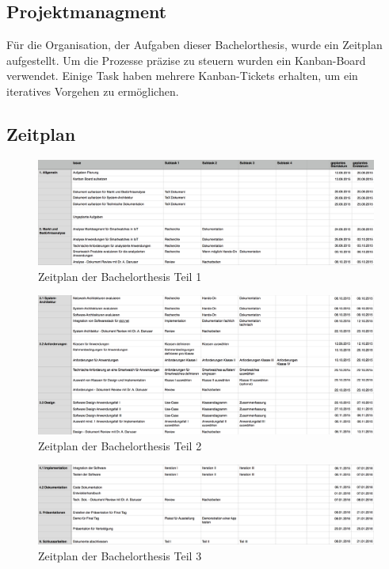 \begin{landscape}
\chapter{Projektmanagment}
Für die Organisation, der Aufgaben dieser Bachelorthesis, wurde ein Zeitplan aufgestellt. Um die Prozesse präzise zu steuern wurden ein Kanban-Board verwendet. Einige Task haben mehrere Kanban-Tickets erhalten, um ein iteratives Vorgehen zu ermöglichen.
\section{Zeitplan}
\begin{figure}[H]
  \centering
  \includegraphics[scale=0.5]{98_Bilder/98_Anhang/zeitplanung_1}
  \caption[Zeitplan Teil 1]{Zeitplan der Bachelorthesis Teil 1}
\end{figure}
\begin{figure}[H]
  \centering
  \includegraphics[scale=0.5]{98_Bilder/98_Anhang/zeitplanung_2}
  \caption[Zeitplan Teil 2]{Zeitplan der Bachelorthesis Teil 2}
\end{figure}
\begin{figure}[H]
  \centering
  \includegraphics[scale=0.5]{98_Bilder/98_Anhang/zeitplanung_3}
  \caption[Zeitplan Teil 3]{Zeitplan der Bachelorthesis Teil 3}
\end{figure}
\end{landscape}
